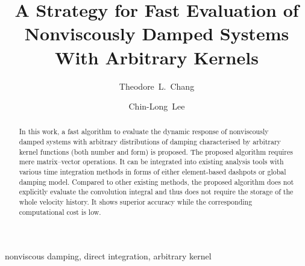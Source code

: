 \documentclass[3p,11pt,fleqn,review,sort&compress]{elsarticle}
\begin{document}
\linenumbers
\begin{abstract}
\begin{linenumbers}
In this work, a fast algorithm to evaluate the dynamic response of nonviscously damped systems with arbitrary distributions of damping characterised by arbitrary kernel functions (both number and form) is proposed. The proposed algorithm requires mere matrix--vector operations. It can be integrated into existing analysis tools with various time integration methods in forms of either element-based dashpots or global damping model. Compared to other existing methods, the proposed algorithm does not explicitly evaluate the convolution integral and thus does not require the storage of the whole velocity history. It shows superior accuracy while the corresponding computational cost is low.
\end{linenumbers}
\end{abstract}
\begin{keyword}
nonviscous damping\sep
direct integration\sep
arbitrary kernel
\end{keyword}
\begin{frontmatter}
\title{A Strategy for Fast Evaluation of Nonviscously Damped Systems With Arbitrary Kernels}
\author[add1]{Theodore~L.~Chang}
\author[add2]{Chin-Long~Lee}
\address[add1]{IRIS Adlershof, Humboldt-Universität zu Berlin, Berlin, Germany, 12489.}
\address[add2]{Department of Civil and Natural Resources Engineering, University of Canterbury, Christchurch, New Zealand, 8041.}
\end{frontmatter}






\end{document}
